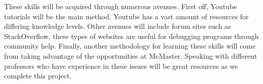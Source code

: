 \documentclass[12pt]{article}
\begin{document}
\noindent
These skills will be acquired through numerous avenues. First off, Youtube tutorials will be the main method. Youtube has a vast amount of resources for differing knowledge levels. Other avenues will include forum sites such as StackOverflow, these types of websites are useful for debugging programs through community help. Finally, another methodology for learning these skills will come from taking advantage of the opportunities at McMaster. Speaking with different professors who have experience in these issues will be great resources as we complete this project.
\end{document}
